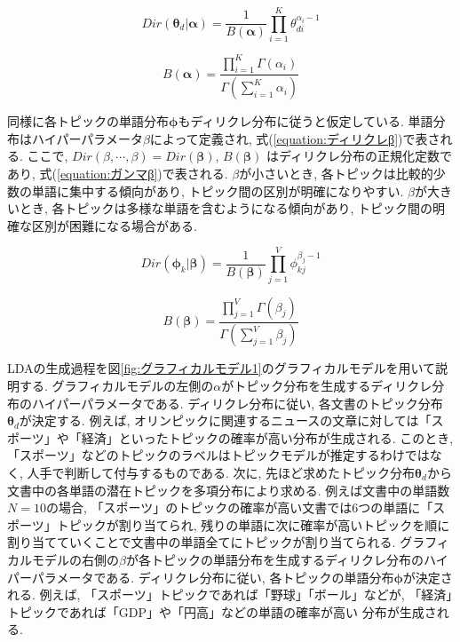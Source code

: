 \documentclass{ltjarticle}
\begin{document}
\begin{equation}
    Dir(\boldsymbol{\theta}_d|\boldsymbol{\alpha}) = \frac{1}{B(\boldsymbol{\alpha})}\prod_{i=1}^{K}\theta_{di}^{\alpha_i-1}
    \label{equation:ディリクレα}
\end{equation}
\vspace{5truept}

\begin{equation}
    B(\boldsymbol{\alpha}) = \frac{\prod_{i=1}^{K}\Gamma(\alpha_i)}{\Gamma(\sum_{i=1}^{K} \alpha_i)}
    \label{equation:ガンマα}
\end{equation}
\vspace{10truept}



同様に各トピックの単語分布$\boldsymbol{\phi}$もディリクレ分布に従うと仮定している. 
単語分布はハイパーパラメータ$\beta$によって定義され, 式(\ref{equation:ディリクレβ})で表される. 
ここで, $Dir(\beta, \cdots, \beta)=Dir(\boldsymbol{\beta})$, $B(\boldsymbol{\beta})$
はディリクレ分布の正規化定数であり, 式(\ref{equation:ガンマβ})で表される. 
$\beta$が小さいとき, 各トピックは比較的少数の単語に集中する傾向があり, 
トピック間の区別が明確になりやすい. 
$\beta$が大きいとき, 各トピックは多様な単語を含むようになる傾向があり, 
トピック間の明確な区別が困難になる場合がある. 
\vspace{5truept}

\begin{equation}
    Dir(\boldsymbol{\phi}_k|\boldsymbol{\beta}) = \frac{1}{B(\boldsymbol{\beta})}\prod_{j=1}^{V}\phi_{kj}^{\beta_j-1}
    \label{equation:ディリクレβ}
\end{equation}
\vspace{5truept}

\begin{equation}
    B(\boldsymbol{\beta}) = \frac{\prod_{j=1}^{V}\Gamma(\beta_j)}{\Gamma(\sum_{j=1}^{V} \beta_j)}
    \label{equation:ガンマβ}
\end{equation}
\vspace{10truept}

LDAの生成過程を図\ref{fig:グラフィカルモデル1}のグラフィカルモデルを用いて説明する. 
グラフィカルモデルの左側の$\alpha$がトピック分布を生成するディリクレ分布のハイパーパラメータである. 
ディリクレ分布に従い, 各文書のトピック分布$\boldsymbol{\theta}_d$が決定する. 
例えば, オリンピックに関連するニュースの文章に対しては「スポーツ」や「経済」といったトピックの確率が高い分布が生成される. 
このとき, 「スポーツ」などのトピックのラベルはトピックモデルが推定するわけではなく, 人手で判断して付与するものである. 
次に, 先ほど求めたトピック分布$\boldsymbol{\theta}_d$から文書中の各単語の潜在トピックを多項分布により求める. 
例えば文書中の単語数$N=10$の場合, 「スポーツ」のトピックの確率が高い文書では6つの単語に「スポーツ」トピックが割り当てられ, 
残りの単語に次に確率が高いトピックを順に割り当てていくことで文書中の単語全てにトピックが割り当てられる. 
グラフィカルモデルの右側の$\beta$が各トピックの単語分布を生成するディリクレ分布のハイパーパラメータである. 
ディリクレ分布に従い, 各トピックの単語分布$\boldsymbol{\phi}$が決定される. 
例えば, 「スポーツ」トピックであれば「野球」「ボール」などが, 「経済」トピックであれば「GDP」や「円高」などの単語の確率が高い
分布が生成される. 
\end{document}
